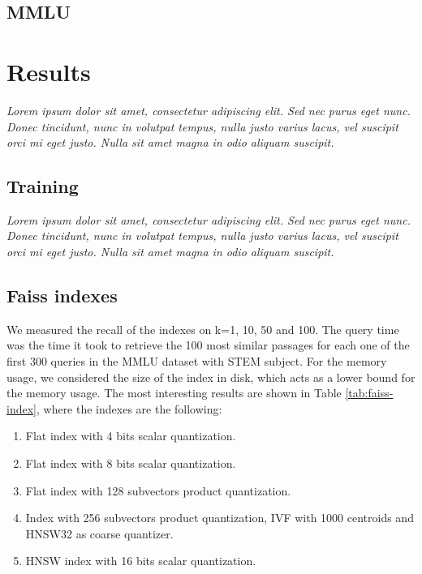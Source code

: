 \documentclass[11pt]{article}
\begin{document}
\subsection{MMLU}

\section{Results}

\textit{Lorem ipsum dolor sit amet, consectetur adipiscing elit. Sed nec purus eget
nunc. Donec tincidunt, nunc in volutpat tempus, nulla justo varius lacus, vel
suscipit orci mi eget justo. Nulla sit amet magna in odio aliquam suscipit.}

\subsection{Training}

\textit{Lorem ipsum dolor sit amet, consectetur adipiscing elit. Sed nec purus eget
nunc. Donec tincidunt, nunc in volutpat tempus, nulla justo varius lacus, vel
suscipit orci mi eget justo. Nulla sit amet magna in odio aliquam suscipit.}

\subsection{Faiss indexes}

We measured the recall of the indexes on k=1, 10, 50 and 100. The query time was 
the time it took to retrieve the 100 most similar passages for each one of the first 300
queries in the MMLU dataset with STEM subject. 
For the memory usage, we considered the size of the index in disk, which acts as a lower
bound for the memory usage.
The most interesting results are shown in Table \ref{tab:faiss-index}, where the indexes 
are the following:

\begin{enumerate}
    \item Flat index with 4 bits scalar quantization.
    \item Flat index with 8 bits scalar quantization.
    \item Flat index with 128 subvectors product quantization. 
    \item Index with 256 subvectors product quantization, IVF with 1000 centroids
    and HNSW32 as coarse quantizer.
    \item HNSW index with 16 bits scalar quantization.
\end{enumerate}
\end{document}

